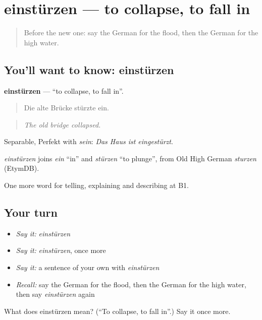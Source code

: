 \section[einstürzen]{einstürzen — to collapse, to fall in}

\label{lesson:GE-C294-einstuerzen}



\begin{quote}
Before the new one: say the German for the flood, then the German for the high water.
\end{quote}

\subsection*{You'll want to know: einstürzen}
\textbf{einstürzen} — \textquotedblleft{}to collapse, to fall in\textquotedblright{}.

\begin{quote}
Die alte Brücke stürzte ein.
\end{quote}

\begin{quote}
\emph{The old bridge collapsed.}
\end{quote}

Separable, Perfekt with \emph{sein}: \emph{Das Haus ist eingestürzt}.

\begin{cousinweb}
\emph{einstürzen} joins \emph{ein} \textquotedblleft{}in\textquotedblright{} and \emph{stürzen} \textquotedblleft{}to plunge\textquotedblright{}, from Old High German \emph{sturzen} (EtymDB).
\end{cousinweb}

\begin{grammarlens}[title={What you've built}]
One more word for telling, explaining and describing at B1.
\end{grammarlens}

\subsection*{Your turn}
\begin{itemize}
\raggedright
  \item \emph{Say it:} \emph{einstürzen}
  \item \emph{Say it:} \emph{einstürzen}, once more
  \item \emph{Say it:} a sentence of your own with \emph{einstürzen}
  \item \emph{Recall:} say the German for the flood, then the German for the high water, then say \emph{einstürzen} again
\end{itemize}

\begin{tcolorbox}[breakable,colback=teal!4,colframe=teal!35!black,title={Before you move on}]
What does einstürzen mean? (\textquotedblleft{}To collapse, to fall in\textquotedblright{}.) Say it once more.
\end{tcolorbox}
